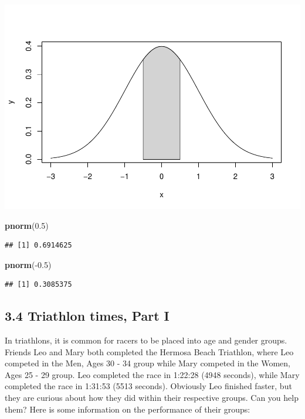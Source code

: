 \documentclass[]{article}
\newenvironment{Shaded}{\begin{snugshade}}{\end{snugshade}}
\newcommand{\KeywordTok}[1]{\textcolor[rgb]{0.13,0.29,0.53}{\textbf{{#1}}}}
\newcommand{\FloatTok}[1]{\textcolor[rgb]{0.00,0.00,0.81}{{#1}}}
\newcommand{\NormalTok}[1]{{#1}}
\begin{document}
\includegraphics{DATA_606_-_Homework_3_files/figure-latex/unnamed-chunk-4-1.pdf}

\begin{Shaded}
\begin{Highlighting}[]
\KeywordTok{pnorm}\NormalTok{(}\FloatTok{0.5}\NormalTok{)}
\end{Highlighting}
\end{Shaded}

\begin{verbatim}
## [1] 0.6914625
\end{verbatim}

\begin{Shaded}
\begin{Highlighting}[]
\KeywordTok{pnorm}\NormalTok{(-}\FloatTok{0.5}\NormalTok{)}
\end{Highlighting}
\end{Shaded}

\begin{verbatim}
## [1] 0.3085375
\end{verbatim}

\subsection{3.4 Triathlon times, Part I}\label{triathlon-times-part-i}

In triathlons, it is common for racers to be placed into age and gender
groups. Friends Leo and Mary both completed the Hermosa Beach Triathlon,
where Leo competed in the Men, Ages 30 - 34 group while Mary competed in
the Women, Ages 25 - 29 group. Leo completed the race in 1:22:28 (4948
seconds), while Mary completed the race in 1:31:53 (5513 seconds).
Obviously Leo finished faster, but they are curious about how they did
within their respective groups. Can you help them? Here is some
information on the performance of their groups:
\end{document}
